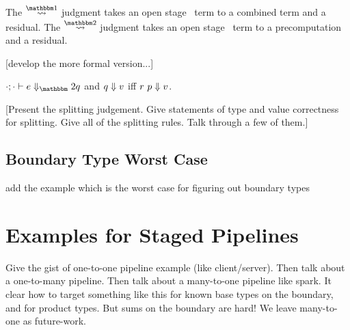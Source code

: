 The $\splitonesym$ judgment takes an open stage \bbone\ term to a combined term and a residual.
The $\splittwosym$ judgment takes an open stage \bbtwo\ term to a precomputation and a residual.

[develop the more formal version...]

  $\diatwo [\cdot;\cdot] e q$ and ${q} \Downarrow {v}$ iff ${r~p} \Downarrow {v}$.

[Present the splitting judgement.  Give statements of type and value correctness for splitting.  Give all of the splitting rules.  Talk through a few of them.]

\subsection {Boundary Type Worst Case}

\TODO add the example which is the worst case for figuring out boundary types



\section{Examples for Staged Pipelines}

Give the gist of one-to-one pipeline example (like client/server).
Then talk about a one-to-many pipeline.
Then talk about a many-to-one pipeline like spark.  It clear how to target something like this for known base types on the boundary, and for product types.  But sums on the boundary are hard!  We leave many-to-one as future-work.
